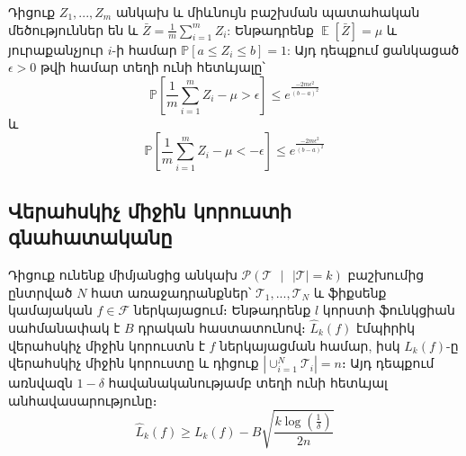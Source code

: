 \documentclass[12pt]{article}
\DeclareMathOperator*{\E}{\mathbb{E}}
\begin{document}
\begin{lemma}
\label{hofding_inq}
Դիցուք $Z_1, ..., Z_m$ անկախ և միևնույն բաշխման պատահական մեծություններ են և $\bar{Z} = \frac{1}{m}\sum_{i=1}^m{Z_i}$: Ենթադրենք $\E[\bar{Z}] = \mu$ և յուրաքանչյուր $i$-ի համար $\mathbb{P}[a \leq Z_i \leq b] = 1$: Այդ դեպքում ցանկացած $\epsilon > 0$ թվի համար տեղի ունի հետևյալը՝
$$\mathbb{P}\left[ \frac{1}{m}\sum_{i=1}^m{Z_i}-\mu > \epsilon \right] \leq e^{\frac{-2m\epsilon^2}{(b-a)^2}}$$ 
և
$$\mathbb{P}\left[ \frac{1}{m}\sum_{i=1}^m{Z_i}-\mu < -\epsilon \right] \leq e^{\frac{-2m\epsilon^2}{(b-a)^2}}$$ 
\end{lemma}

\subsection*{\hfill Վերահսկիչ միջին կորուստի գնահատականը \hfill} \noindent
{}
{}

\begin{lemma}
\label{task_conc_lemm}
Դիցուք ունենք միմյանցից անկախ $\mathcal{P}(\mathcal{T} \text{ } |\text{ }  |\mathcal{T}| = k)$ բաշխումից ընտրված $N$ հատ առաջադրանքներ՝ $\mathcal{T}_1, ..., \mathcal{T}_N$ և ֆիքսենք կամայական $f \in \mathcal{F}$ ներկայացում։ Ենթադրենք $l$ կորստի ֆունկցիան սահմանափակ է $B$ դրական հաստատունով։ $\hat{L}_k(f)$ էմպիրիկ վերահսկիչ միջին կորուստն է $f$ ներկայացման համար,  իսկ $L_k(f)$-ը վերահսկիչ միջին կորուստը և դիցուք $|\cup_{i=1}^N{\mathcal{T}_i}| = n$։
Այդ դեպքում առնվազն $1-\delta$ հավանականությամբ տեղի ունի հետևյալ անհավասարությունը։
\begin{equation}
\hat{L}_k(f) \geq L_k(f) - B\sqrt{\frac{k\log \left(\frac{1}{\delta}\right) }{2n}}
\end{equation}
\end{lemma}
\end{document}
